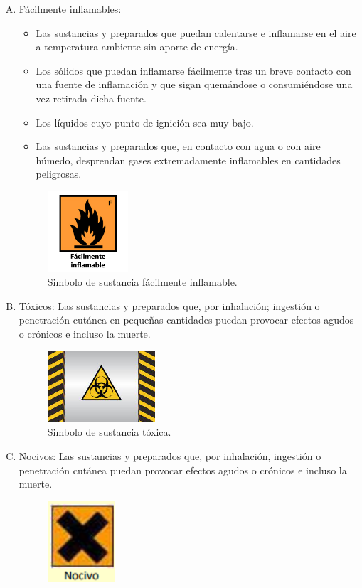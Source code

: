\documentclass[letterpaper]{IEEEconf}
\begin{document}
\begin{enumerate}[A.]
\item Fácilmente inflamables:
	\begin{itemize}
	\item Las sustancias y preparados que puedan calentarse e inflamarse en el aire a temperatura ambiente sin aporte de energía.
	\item Los sólidos que puedan inflamarse fácilmente tras un breve contacto con una fuente de inflamación y que sigan quemándose o consumiéndose una vez retirada dicha fuente.
	\item Los líquidos cuyo punto de ignición sea muy bajo.
	\item Las sustancias y preparados que, en contacto con agua o con aire húmedo, desprendan gases extremadamente inflamables en cantidades peligrosas.
	\end{itemize}
	\begin{figure}[H]
	\centering
	\includegraphics[width=3cm]{inflamable}
	\caption{Simbolo de sustancia fácilmente inflamable.}
	\end{figure}
\item Tóxicos: Las sustancias y preparados que, por inhalación; ingestión o penetración cutánea en pequeñas cantidades puedan provocar efectos agudos o crónicos e incluso la muerte.
\begin{figure}[H]
\centering
\includegraphics[width=4cm]{peligro}
\caption{Simbolo de sustancia tóxica.}
\end{figure} 
\item Nocivos: Las sustancias y preparados que, por inhalación, ingestión o penetración cutánea puedan provocar efectos agudos o crónicos e incluso la muerte.
\begin{figure}[H]
\centering
\includegraphics[width=2.5cm]{nocivo}

\end{figure}
\end{enumerate}
\end{document}
